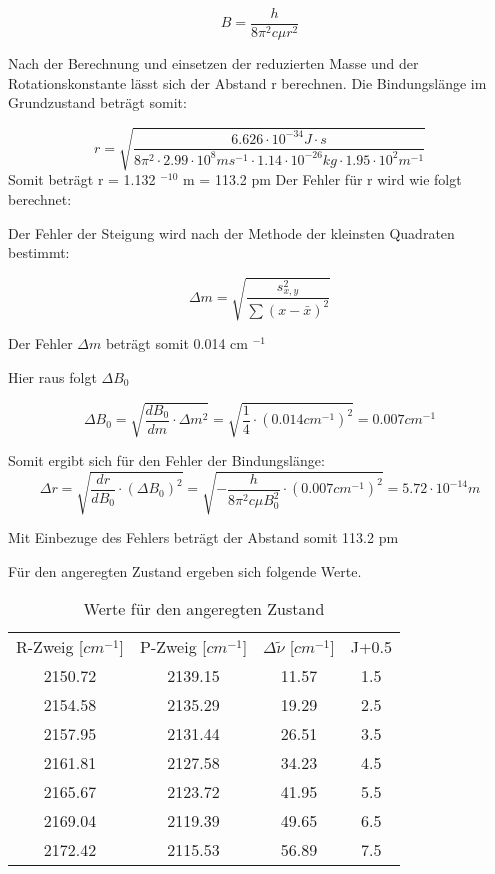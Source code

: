 \documentclass[12pt]{article}
\begin{document}
  \begin{equation}
      B =\frac{\si{h}}{8\pi^2c\mu r^2}
  \end{equation}
  
  Nach der Berechnung und einsetzen der reduzierten Masse und der Rotationskonstante lässt sich der Abstand r berechnen. Die Bindungslänge im Grundzustand beträgt somit:
  
  \begin{equation}
      r = \sqrt {\frac{6.626\cdot 10^{-34} J\cdot s}{8\pi^2\cdot 2.99 \cdot 10^8 ms^{-1} \cdot  1.14\cdot 10^{-26}kg\cdot 1.95\cdot 10^2m^{-1}}}
  \end{equation}
  Somit beträgt r = 1.132 $^{-10}$ m = 113.2 pm
  Der Fehler für r wird wie folgt berechnet:
  
  Der Fehler der Steigung wird nach der Methode der kleinsten Quadraten bestimmt:
  
  \begin{equation}
      \Delta m = \sqrt{\frac{s^2_{x,y}}{\sum (x-\bar{x})^2}}
  \end{equation}
  
  Der Fehler $\Delta m$ beträgt somit 0.014 cm $^{-1}$
  
  Hier raus folgt $\Delta B_0$ 
  
  \begin{equation}
      \Delta B_0 = \sqrt{\frac{dB_0}{dm}\cdot \Delta m^2} = \sqrt{\frac{1}{4}\cdot (0.014 cm^{-1})^2} = 0.007 cm^{-1}
  \end{equation}
  
  Somit ergibt sich für den Fehler der Bindungslänge:
  \begin{equation}
      \Delta r = \sqrt{\frac{dr}{dB_0} \cdot (\Delta B_0)^2} =  \sqrt{-\frac{h}{8\pi^2c\mu B_0^2}\cdot (0.007 cm^{-1})^2} = 5.72 \cdot 10^{-14} m 
  \end{equation}
  
  Mit Einbezuge des Fehlers beträgt der Abstand somit 113.2  pm
  
  Für den angeregten Zustand ergeben sich folgende Werte.
  
  \begin{table}[htpb]
  \centering
  \caption{Werte für den angeregten Zustand}
  \begin{tabular}{cccc}
    R-Zweig [$cm^{-1}$] & P-Zweig [$cm^{-1}$] & $\Delta \tilde {\nu}$ [$cm^{-1}$] & J+0.5\\
2150.72 & 2139.15 &  11.57 & 1.5\\
2154.58 & 2135.29 &  19.29 & 2.5\\
2157.95 & 2131.44 &  26.51 & 3.5\\
2161.81 & 2127.58 &  34.23 & 4.5\\
2165.67 & 2123.72 &  41.95 & 5.5\\
2169.04 & 2119.39 &  49.65 & 6.5\\
2172.42 & 2115.53 &  56.89 & 7.5\\
  
  \end{tabular}

\end{table}
 
\end{document}
